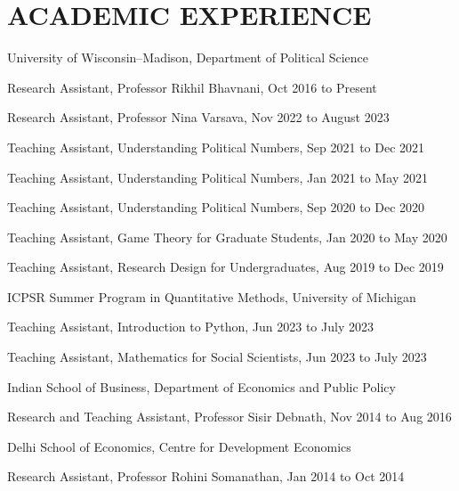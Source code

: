 \documentclass[10pt,letterpaper]{article}
\renewenvironment{itemize}{
  \begin{list}{}{
      \setlength{\leftmargin}{1.5em}
      \setlength{\itemsep}{0.25em}
      \setlength{\parskip}{0pt}
      \setlength{\parsep}{0.25em}
    }
}{
  \end{list}
}
\begin{document}
\section*{ACADEMIC EXPERIENCE}

\begin{itemize}
\item University of Wisconsin--Madison, Department of Political Science
  \begin{itemize}
  \item Research Assistant, Professor Rikhil Bhavnani, Oct 2016 to Present
             \item Research Assistant, Professor Nina Varsava, Nov 2022 to August 2023
             \item Teaching Assistant, Understanding Political Numbers, Sep 2021 to Dec 2021
         \item Teaching Assistant, Understanding Political Numbers, Jan 2021 to May 2021
       \item Teaching Assistant, Understanding Political Numbers, Sep 2020 to Dec 2020
    \item Teaching Assistant, Game Theory for Graduate Students, Jan 2020 to May 2020
  \item Teaching Assistant, Research Design for Undergraduates, Aug 2019 to Dec 2019
  \end{itemize}
  \item ICPSR Summer Program in Quantitative Methods, University of Michigan
    \begin{itemize}
    \item Teaching Assistant, Introduction to Python, Jun 2023 to July 2023
        \item Teaching Assistant, Mathematics for Social Scientists, Jun 2023 to July 2023
      \end{itemize}
\item Indian School of Business, Department of Economics and Public Policy
  \begin{itemize}
 \item Research and Teaching Assistant, Professor Sisir Debnath, Nov 2014 to Aug 2016
  \end{itemize}
\item Delhi School of Economics, Centre for Development Economics
    \begin{itemize}
    \item Research Assistant, Professor Rohini Somanathan, Jan 2014 to Oct 2014
  \end{itemize}
\end{itemize}
\end{document}
